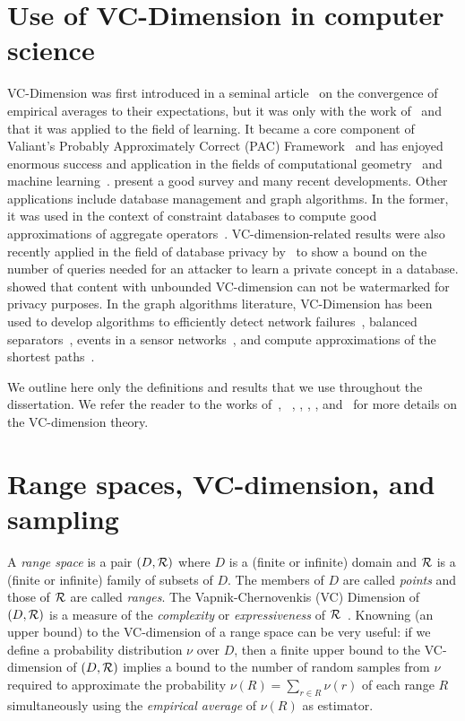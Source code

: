 \section{Use of VC-Dimension in computer science}\label{sec:vcliterature}
VC-Dimension was first introduced in a seminal article~\citep{VapnikC71} on
the convergence of empirical averages to their expectations, but it was only with the work
of~\citet{HausslerW86} and~\citet{BlumerEHW89} that it was applied to the field
of learning. It became a core component of Valiant's Probably Approximately
Correct (PAC) Framework~\citep{KearnsV94} and has enjoyed enormous success and
application in the fields of computational
geometry~\citep{Chazelle00,Matousek02} and machine
learning~\citep{AnthonyB99,DevroyeGL96}. \citet{BoucheronBL05} present a good
survey and many recent developments. Other applications include database
management and graph algorithms. In the former, it was used in the context of
constraint databases to compute good approximations of aggregate
operators~\citep{BenediktL02}. VC-dimension-related results were also recently
applied in the field of database privacy by~\citet{BlumLR08} to show a bound on
the number of queries needed for an attacker to learn a private concept in a
database. \citet{Gross11} showed that content with unbounded VC-dimension can
not be watermarked for privacy purposes. In the graph algorithms literature,
VC-Dimension has been used to develop algorithms to efficiently detect network
failures~\citep{Kleinberg03,KleinbergSS08}, balanced
separators~\citep{FeigeM06}, events in a sensor networks~\citep{GandhiSW10}, and
compute approximations of the shortest paths~\citep{AbrahamDFGW11}.

We outline here only the definitions and results that we use throughout the
dissertation. We refer the reader to the works of~\citet[Sect.~14.4]{AlonS08},
~\citet[Sect.~3]{BoucheronBL05}, \citet[Chap.~4]{Chazelle00},
\citet[Sect.~12.4]{DevroyeGL96}, \citet[Chap.~3]{MohriRT12},
and~\citet{Vapnik99,Vapnik98} for more details on the VC-dimension theory. 

\section{Range spaces, VC-dimension, and sampling}
A {\em range space} is a pair $(D,\mathcal{R})$ where $D$ is a (finite or infinite)
domain and $\mathcal{R}$ is a (finite or infinite) family of subsets of $D$. The
members of $D$ are called {\em points} and those of $\mathcal{R}$ are called {\em ranges}.
The Vapnik-Chernovenkis (VC) Dimension of $(D,\mathcal{R})$ is a measure of the
\emph{complexity} or \emph{expressiveness} of $\mathcal{R}$~\citep{VapnikC71}.
Knowning (an upper bound) to the VC-dimension of a range space can be very
useful: if we define a probability distribution $\nu$ over $D$, then a finite
upper bound to the VC-dimension of $(D,\mathcal{R})$ implies a bound to the number of
random samples from $\nu$ required to approximate the probability
$\nu(R)=\sum_{r\in R}\nu(r)$ of each range $R$ simultaneously using the
\emph{empirical average} of $\nu(R)$ as estimator. 

